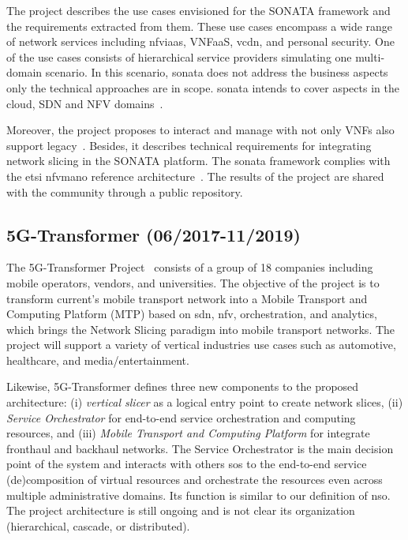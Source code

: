 The project describes the use cases envisioned for the SONATA framework and the requirements extracted from them. These use cases encompass a wide range of network services including \gls{nfviaas}, VNFaaS,  v\gls{cdn}, and personal security. One of the use cases consists of hierarchical service providers simulating one multi-domain scenario. In this scenario, \gls{sonata} does not address the business aspects only the technical approaches are in scope. \gls{sonata} intends to cover aspects in the cloud, SDN and NFV domains~\cite{SONATAProject2015D2.2Design}.

Moreover, the project proposes to interact and manage with not only VNFs also support legacy~\cite{SONATAProject2016D2.3Design}. Besides, it describes technical requirements for integrating network slicing in the SONATA platform.  The \gls{sonata} framework complies with the \gls{etsi} \gls{nfvmano} reference architecture~\cite{SONATAProject2016D2.3Design}. The results of the project are shared with the community through a public repository.

\subsection{5G-Transformer (06/2017-11/2019)}
The 5G-Transformer Project~\cite{5g-TransformerProject20175GVerticals} consists of a group of 18 companies including mobile operators, vendors, and universities. The objective of the project is to transform current’s mobile transport network into a Mobile Transport and Computing Platform (MTP) based on \gls{sdn}, \gls{nfv}, orchestration, and analytics, which brings the Network Slicing paradigm into mobile transport networks. The project will support a variety of vertical industries use cases such as automotive, healthcare, and media/entertainment. 

Likewise, 5G-Transformer defines three new components to the proposed architecture: (i) \textit{vertical slicer} as a logical entry point to create network slices, (ii) \textit{Service Orchestrator} for end-to-end service orchestration and computing resources, and (iii) \textit{Mobile Transport and Computing Platform} for integrate fronthaul and backhaul networks. The Service Orchestrator is the main decision point of the system and interacts with others \glspl{so} to the end-to-end service (de)composition of virtual resources and orchestrate the resources even across multiple administrative domains. Its function is similar to our definition of \gls{nso}. The project architecture is still ongoing and is not clear its organization (hierarchical, cascade, or distributed).
 
